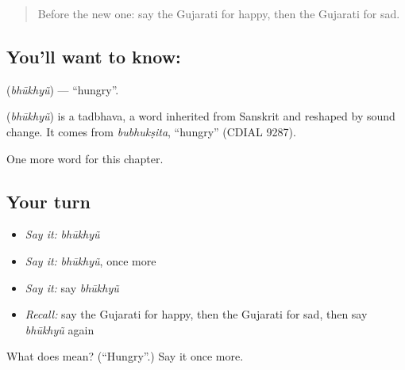 \begin{quote}
Before the new one: say the Gujarati for happy, then the Gujarati for sad.
\end{quote}

\subsection*{You'll want to know: }
\textbf{} (\emph{bhūkhyũ}) — \textquotedblleft{}hungry\textquotedblright{}.

\begin{cousinweb}
\textbf{} (\emph{bhūkhyũ}) is a tadbhava, a word inherited from Sanskrit and reshaped by sound change. It comes from \emph{bubhukṣita}, \textquotedblleft{}hungry\textquotedblright{} (CDIAL 9287).
\end{cousinweb}

\begin{grammarlens}[title={What you've built}]
One more word for this chapter.
\end{grammarlens}

\subsection*{Your turn}
\begin{itemize}
\raggedright
  \item \emph{Say it:} \emph{bhūkhyũ}
  \item \emph{Say it:} \emph{bhūkhyũ}, once more
  \item \emph{Say it:} say \emph{bhūkhyũ}
  \item \emph{Recall:} say the Gujarati for happy, then the Gujarati for sad, then say \emph{bhūkhyũ} again
\end{itemize}

\begin{tcolorbox}[breakable,colback=teal!4,colframe=teal!35!black,title={Before you move on}]
What does  mean? (\textquotedblleft{}Hungry\textquotedblright{}.) Say it once more.
\end{tcolorbox}
